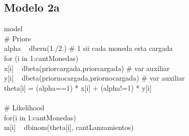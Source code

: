 \documentclass[a4paper]{article}
\begin{document}
\subsection{Modelo 2a}

model { \\
  # Priors \\
  alpha ~ dbern(1./2.) # 1 sii cada moneda esta cargada \\
  for (i in 1:cantMonedas) { \\
    x[i] ~ dbeta(priorcargada,priorcargada)     # var auxiliar \\
    y[i] ~ dbeta(priornocargada,priornocargada) # var auxiliar \\
    theta[i] = (alpha==1) * x[i] + (alpha!=1) * y[i] \\
  } \\
  # Likelihood \\
  for(i in 1:cantMonedas) { \\
    m[i] ~ dbinom(theta[i], cantLanzamientos) \\
  } \\
} \\


%
%
% 
%
\end{document}
